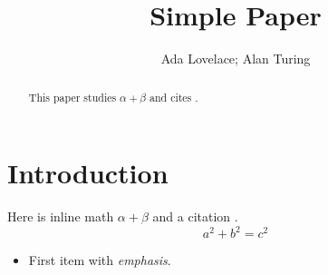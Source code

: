 \documentclass{article}
\title{Simple Paper}
\author{Ada Lovelace; Alan Turing}
\begin{document}
\maketitle
\begin{abstract}
This paper studies $\alpha + \beta$ and cites \cite{einstein}.
\end{abstract}
\section{Introduction}
Here is inline math $\alpha + \beta$ and a citation \cite{einstein}.
\[
a^2 + b^2 = c^2
\]
\begin{itemize}
\item First item with \emph{emphasis}.
\end{itemize}

\end{document}
